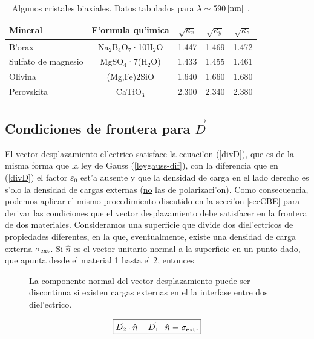 \begin{table}[!h]
\begin{center}
\begin{tabular}{l c |c|c|c}
Mineral			& F'ormula qu'imica		& $\sqrt{\kappa_x}$	&	$\sqrt{\kappa_y}$	&  $\sqrt{\kappa_z}$	\\
\hline\hline
B'orax 	 		&Na$_2$B$_4$O$_7$·10H$_2$O& 	1.447	& 	1.469	& 	1.472	\\
Sulfato de magnesio		&  MgSO$_4$·7(H$_2$O)	& 	1.433	& 	1.455	& 	1.461	\\
Olivina			& 	(Mg,Fe)2SiO	& 	1.640	& 	1.660	& 	1.680	\\
Perovskita		& 	CaTiO$_3$	& 	2.300	& 	2.340	& 	2.380	%
\end{tabular}
\caption{Algunos cristales biaxiales. Datos tabulados para $\lambda\sim 590\,{\rm [nm]}$ \cite{hyper}.}
\end{center}
\end{table}
\subsection{Condiciones de frontera para $\vec{D}$}

El vector desplazamiento el'ectrico satisface la ecuaci'on (\ref{divD}), que es
de la misma forma que la ley de Gauss (\ref{leygauss-dif}), con la diferencia
que en (\ref{divD}) el factor $\varepsilon_0$ est'a ausente y que la densidad de carga en el lado derecho es s'olo la densidad de cargas externas (\underline{no} las de polarizaci'on). Como consecuencia, podemos aplicar el mismo procedimiento discutido en la secci'on \ref{secCBE} para derivar las condiciones que el vector desplazamiento debe satisfacer en la frontera de dos materiales. Consideramos una superficie que divide dos diel'ectricos de propiedades diferentes, en la que, eventualmente, existe una densidad de carga externa $\sigma_{\rm ext}$. Si $\hat{n}$ es el vector unitario normal a la superficie en un punto dado, que apunta desde el material 1 hasta el 2, entonces
\begin{figure}[!h]
\centerline{}
\caption{La componente normal del vector desplazamiento puede ser discontinua
si existen cargas externas en el la interfase entre dos diel'ectrico.}
\label{CF1}
\end{figure}
\begin{equation}\label{saltoDn}
\boxed{\vec{D_2}\cdot\hat{n}-\vec{D_1}\cdot\hat{n}=\sigma_{\rm
ext}.}
\end{equation}

